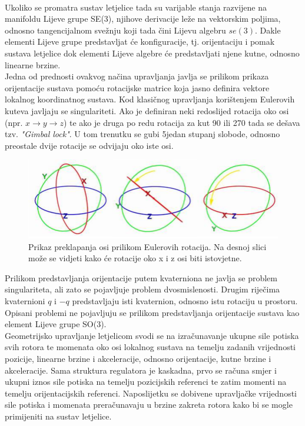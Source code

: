 \documentclass[times, utf8, diplomski]{fer}
\begin{document}
	\paragraph{}Ukoliko se promatra sustav letjelice tada su varijable stanja razvijene na manifoldu Lijeve grupe SE(3), njihove derivacije leže na vektorskim poljima, odnosno tangencijalnom svežnju koji tada čini Lijevu algebru $se(3)$. Dakle elementi Lijeve grupe predstavljat će konfiguracije, tj. orijentaciju i pomak sustava letjelice dok elementi Lijeve algebre će predstavljati njene kutne, odnosno linearne brzine. \\
	Jedna od prednosti ovakvog načina upravljanja javlja se prilikom prikaza orijentacije sustava pomoću rotacijske matrice koja jasno definira vektore lokalnog koordinatnog sustava. Kod klasičnog upravljanja korištenjem Eulerovih kuteva javljaju se singulariteti. Ako je definiran neki redoslijed rotacija oko osi (npr. $x \rightarrow y \rightarrow z$) te ako je druga po redu rotacija za kut 90 ili 270 tada se dešava tzv. \textit{"Gimbal lock"}. U tom trenutku se gubi 5jedan stupanj slobode, odnosno preostale dvije rotacije se odvijaju oko iste osi.
	
	\begin{figure}[h!]
		\includegraphics[width=\textwidth]{figures/gimbal_lock.png}
		\caption{Prikaz preklapanja osi prilikom Eulerovih rotacija. Na desnoj slici može se vidjeti kako će rotacije oko x i z osi biti istovjetne.}
	\end{figure}
	
	\noindent Prilikom predstavljanja orijentacije putem kvaterniona ne javlja se problem singulariteta, ali zato se pojavljuje problem dvosmislenosti. Drugim riječima kvaternioni $q$ i $-q$ predstavljaju isti kvaternion, odnosno istu rotaciju u prostoru. Opisani problemi ne pojavljuju se prilikom predstavljanja orijentacije sustava kao element Lijeve grupe SO(3). \\
	Geometrijsko upravljanje letjelicom svodi se na izračunavanje ukupne sile potiska svih rotora te momenata oko osi lokalnog sustava na temelju zadanih vrijednosti pozicije, linearne brzine i akceleracije, odnosno orijentacije, kutne brzine i akceleracije. Sama struktura regulatora je kaskadna, prvo se računa smjer i ukupni iznos sile potiska na temelju pozicijskih referenci te zatim momenti na temelju orijentacijskih referenci. Naposlijetku se dobivene upravljačke vrijednosti sile potiska i momenata preračunavaju u brzine zakreta rotora kako bi se mogle primijeniti na sustav letjelice.
\end{document}
